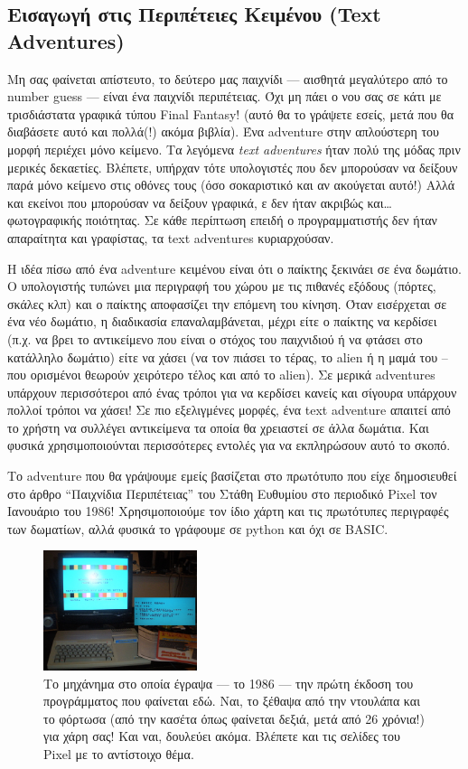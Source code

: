 \subsection{Εισαγωγή στις Περιπέτειες Κειμένου (Text Adventures)}
%
Μη σας φαίνεται απίστευτο, το δεύτερο μας παιχνίδι --- αισθητά μεγαλύτερο από
το number guess --- είναι ένα παιχνίδι περιπέτειας. Όχι μη πάει ο νου σας σε
κάτι με τρισδιάστατα γραφικά τύπου Final Fantasy! (αυτό θα το γράψετε εσείς,
μετά που θα διαβάσετε αυτό και πολλά(!) ακόμα βιβλία). Ένα adventure στην απλούστερη του μορφή περιέχει μόνο κείμενο. Τα λεγόμενα {\em text adventures} ήταν πολύ της μόδας πριν μερικές δεκαετίες. Βλέπετε, υπήρχαν τότε υπολογιστές που δεν μπορούσαν να δείξουν παρά μόνο κείμενο στις οθόνες τους (όσο σοκαριστικό και αν ακούγεται αυτό!) Αλλά και εκείνοι που μπορούσαν να δείξουν γραφικά, ε δεν ήταν ακριβώς και\ldots{} φωτογραφικής ποιότητας. Σε κάθε περίπτωση επειδή ο προγραμματιστής δεν ήταν απαραίτητα και γραφίστας, τα text adventures κυριαρχούσαν.

Η ιδέα πίσω από ένα adventure κειμένου είναι ότι ο παίκτης ξεκινάει σε ένα
δωμάτιο. Ο υπολογιστής τυπώνει μια περιγραφή του χώρου με τις πιθανές
εξόδους (πόρτες, σκάλες κλπ) και ο παίκτης αποφασίζει την επόμενη του
κίνηση. Όταν εισέρχεται σε ένα νέο δωμάτιο, η διαδικασία επαναλαμβάνεται,
μέχρι είτε ο παίκτης να κερδίσει (π.χ. να βρει το αντικείμενο που είναι ο
στόχος του παιχνιδιού ή να φτάσει στο κατάλληλο δωμάτιο) είτε να χάσει (να
τον πιάσει το τέρας, το alien ή η μαμά του -- που ορισμένοι θεωρούν χειρότερο
τέλος και από το alien). Σε μερικά adventures υπάρχουν περισσότεροι από ένας
τρόποι για να κερδίσει κανείς και σίγουρα υπάρχουν πολλοί τρόποι να χάσει!
Σε πιο εξελιγμένες μορφές, ένα text adventure απαιτεί από το χρήστη να
συλλέγει αντικείμενα τα οποία θα χρειαστεί σε άλλα δωμάτια. Και φυσικά
χρησιμοποιούνται περισσότερες εντολές για να εκπληρώσουν αυτό το σκοπό.

Το adventure που θα γράψουμε εμείς βασίζεται στο πρωτότυπο που είχε
δημοσιευθεί στο άρθρο ``Παιχνίδια Περιπέτειας'' του Στάθη Ευθυμίου στο
περιοδικό Pixel τον Ιανουάριο του 1986! Χρησιμοποιούμε τον ίδιο χάρτη και
τις πρωτότυπες περιγραφές των δωματίων, αλλά φυσικά το γράφουμε σε python
και όχι σε BASIC.

\begin{figure}
  \centering
  \includegraphics[width=0.4\textwidth]{images/chapter2/ti99-2}
  \caption[TI-99/4A: Από το Χρονοντούλαπο]{Το μηχάνημα στο οποία έγραψα --- το 1986 --- την πρώτη έκδοση του προγράμματος που φαίνεται εδώ. Ναι, το ξέθαψα από την ντουλάπα και το φόρτωσα (από την κασέτα όπως φαίνεται δεξιά, μετά από 26 χρόνια!) για χάρη σας! Και ναι, δουλεύει ακόμα. Βλέπετε και τις σελίδες του Pixel με το αντίστοιχο θέμα.}
  \label{2-1}
\end{figure}

